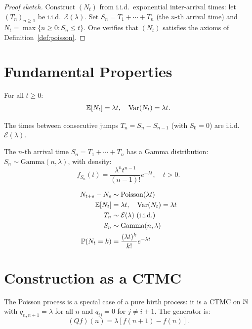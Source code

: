 \begin{proof}[Proof sketch]
Construct $(N_t)$ from i.i.d.\ exponential inter-arrival times: let
$(T_n)_{n \geq 1}$ be i.i.d.\ $\mathcal{E}(\lambda)$. Set
$S_n = T_1 + \cdots + T_n$ (the $n$-th arrival time) and
$N_t = \max\{n \geq 0 : S_n \leq t\}$. One verifies that $(N_t)$ satisfies
the axioms of Definition~\ref{def:poisson}.
\end{proof}

\section{Fundamental Properties}

\begin{proposition}[Moments]
For all $t \geq 0$:
\[
  \mathbb{E}[N_t] = \lambda t, \quad \mathrm{Var}(N_t) = \lambda t.
\]
\end{proposition}

\begin{proposition}
The times between consecutive jumps $T_n = S_n - S_{n-1}$ (with $S_0 = 0$) are
i.i.d.\ $\mathcal{E}(\lambda)$.
\end{proposition}

\begin{proposition}
The $n$-th arrival time $S_n = T_1 + \cdots + T_n$ has a Gamma distribution:
$S_n \sim \text{Gamma}(n, \lambda)$, with density:
\[
  f_{S_n}(t) = \frac{\lambda^n t^{n-1}}{(n-1)!} e^{-\lambda t}, \quad t > 0.
\]
\end{proposition}

\begin{keyformulas}[title=\textbf{Poisson Process Properties}]
\begin{align*}
  N_{t+s} - N_s &\sim \text{Poisson}(\lambda t) \\
  \mathbb{E}[N_t] &= \lambda t, \quad \mathrm{Var}(N_t) = \lambda t \\
  T_n &\sim \mathcal{E}(\lambda) \text{ (i.i.d.)} \\
  S_n &\sim \text{Gamma}(n, \lambda) \\
  \mathbb{P}(N_t = k) &= \frac{(\lambda t)^k}{k!} e^{-\lambda t}
\end{align*}
\end{keyformulas}

\section{Construction as a CTMC}

\begin{remark}
The Poisson process is a special case of a pure birth process: it is a CTMC on
$\mathbb{N}$ with $q_{n,n+1} = \lambda$ for all $n$ and $q_{ij} = 0$ for $j \neq i + 1$.
The generator is:
\[
  (Qf)(n) = \lambda [f(n+1) - f(n)].
\]
\end{remark}

